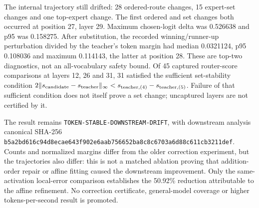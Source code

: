 The internal trajectory still drifted: 28 ordered-route changes, 15 expert-set
changes and one top-expert change.  The first ordered and set changes both
occurred at position 27, layer 29.  Maximum chosen-logit delta was 0.526638 and
p95 was 0.158275.  After substitution, the recorded winning/runner-up
perturbation divided by the teacher's token margin had median 0.0321124, p95
0.108036 and maximum 0.114143, the latter at position 28.  These are top-two
diagnostics, not an all-vocabulary safety bound.  Of 45 captured router-score
comparisons at layers 12, 26 and 31, 31 satisfied the sufficient set-stability
condition \(2\|s_{\rm candidate}-s_{\rm teacher}\|_\infty <
s_{\rm teacher,(4)}-s_{\rm teacher,(5)}\).  Failure of that sufficient condition
does not itself prove a set change; uncaptured layers are not certified by it.

The result remains \texttt{TOKEN-STABLE-DOWNSTREAM-DRIFT}, with downstream
analysis canonical SHA-256
\texttt{b5a2bd616c94d8ecae643f902e6aab756652ba8c8c6703a6d88c611cb3211def}.
Counts and normalized margins differ from the older correction experiment,
but the trajectories also differ: this is not a matched ablation proving that
addition-order repair or affine fitting caused the downstream improvement.
Only the same-activation local-error comparison establishes the 50.92\%
reduction attributable to the affine refinement.  No correction certificate,
general-model coverage or higher tokens-per-second result is promoted.
